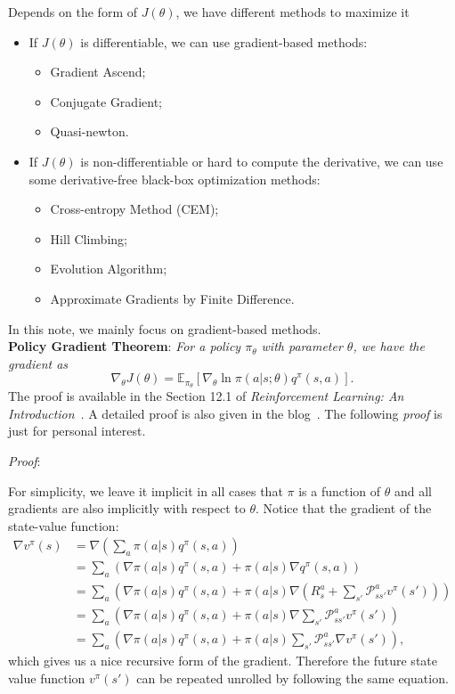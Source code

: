 \documentclass{progartcn}
\begin{document}
		Depends on the form of $J(\theta)$, we have different methods to maximize it
		\begin{itemize}[noitemsep,topsep=0pt]
			\item If $J(\theta)$ is differentiable, we can use gradient-based methods:
			\begin{itemize}[noitemsep,topsep=0pt]
				\item Gradient Ascend;
				\item Conjugate Gradient;
				\item Quasi-newton.
			\end{itemize}
			\item If $J(\theta)$ is non-differentiable or hard to compute the derivative, we can use some derivative-free black-box optimization methods:
			\begin{itemize}[noitemsep,topsep=0pt]
				\item Cross-entropy Method (CEM);
				\item Hill Climbing;
				\item Evolution Algorithm;
				\item Approximate Gradients by Finite Difference.
			\end{itemize}
		\end{itemize}
		In this note, we mainly focus on gradient-based methods.\\

		\textbf{Policy Gradient Theorem}: \textit{For a policy $\pi_\theta$ with parameter $\theta$, we have the gradient as}
		\[\nabla_\theta J(\theta)=\mathbb{E}_{\pi_\theta}[\nabla_\theta \ln \pi(a|s;\theta) q^\pi(s,a)].\]
		The proof is available in the Section 12.1 of \textit{Reinforcement Learning: An Introduction}~\cite{sutton2018reinforcement}. A detailed proof is also given in the blog~\cite{liblog-pga}. The following \textit{proof} is just for personal interest.

		\textit{Proof}:

		For simplicity, we leave it implicit in all cases that $\pi$ is a function of $\theta$ and all gradients are also implicitly with respect to $\theta$. Notice that the gradient of the state-value function:
		\begin{align*}
			\nabla v^\pi(s)&=\nabla \left(\sum_{a} \pi(a|s)q^\pi(s,a)\right)\\
			&=\sum_a\left(\nabla \pi(a|s)q^\pi(s,a)+\pi(a|s)\nabla q^\pi(s,a)\right)\tag{Product rule of calculus}\\
			&=\sum_a\left(\nabla\pi(a|s)q^\pi(s,a)+\pi(a|s)\nabla\left(R_s^a+\sum_{s'}\mathcal{P}_{ss'}^a v^\pi(s')\right)\right)\tag{Sec 5.2 MDP}\\
			&=\sum_a\left(\nabla\pi(a|s)q^\pi(s,a)+\pi(a|s)\nabla\sum_{s'}\mathcal{P}_{ss'}^av^\pi(s')\right)\tag{\(R_s^a\) is irrevalent to \(\theta\)}\\
			&=\sum_a\left(\nabla\pi(a|s)q^\pi(s,a)+\pi(a|s)\sum_{s'}\mathcal{P}_{ss'}^a\nabla v^\pi(s')\right),
		\end{align*}
		which gives us a nice recursive form of the gradient. Therefore the future state value function $v^\pi(s')$ can be repeated unrolled by following the same equation. 
\end{document}
